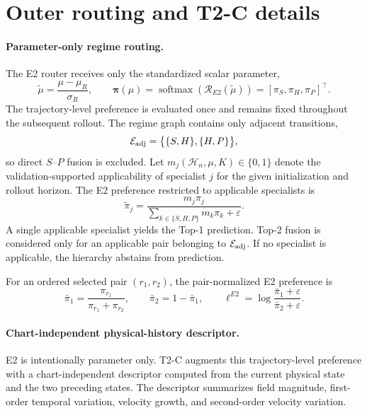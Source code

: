 \section{Outer routing and T2-C details}
\label{app:routing}

\paragraph{Parameter-only regime routing.}
The E2 router receives only the standardized scalar parameter,
\begin{equation}
  \widetilde\mu
  =
  \frac{\mu-\mu_R}{\sigma_R},
  \qquad
  \bm\pi(\mu)
  =
  \operatorname{softmax}
  \left(
    \mathcal R_{E2}(\widetilde\mu)
  \right)
  =
  [\pi_S,\pi_H,\pi_P]^\top .
  \label{eq:app_e2_parameter_only}
\end{equation}
The trajectory-level preference is evaluated once and remains fixed
throughout the subsequent rollout. The regime graph contains only adjacent transitions,
\begin{equation}
  \mathcal E_{\rm adj}
  =
  \bigl\{
    \{S,H\},
    \{H,P\}
  \bigr\},
  \label{eq:app_adjacency}
\end{equation}
so direct $S$--$P$ fusion is excluded.
Let
$m_j(\mathcal H_n,\mu,K)\in\{0,1\}$
denote the validation-supported applicability of specialist $j$ for the
given initialization and rollout horizon.
The E2 preference restricted to applicable specialists is
\begin{equation}
  \widetilde\pi_j
  =
  \frac{
    m_j\pi_j
  }{
    \sum_{k\in\{S,H,P\}}m_k\pi_k+\varepsilon
  }.
  \label{eq:app_masked_e2}
\end{equation}
A single applicable specialist yields the Top-1 prediction.
Top-2 fusion is considered only for an applicable pair belonging to
$\mathcal E_{\rm adj}$.
If no specialist is applicable, the hierarchy abstains from prediction.

For an ordered selected pair $(r_1,r_2)$, the pair-normalized E2
preference is
\begin{equation}
  \bar\pi_1
  =
  \frac{\pi_{r_1}}
       {\pi_{r_1}+\pi_{r_2}},
  \qquad
  \bar\pi_2
  =
  1-\bar\pi_1,
  \qquad
  \ell^{E2}
  =
  \log
  \frac{\bar\pi_1+\varepsilon}
       {\bar\pi_2+\varepsilon}.
  \label{eq:app_pair_logit}
\end{equation}


\paragraph{Chart-independent physical-history descriptor.}
E2 is intentionally parameter only.
T2-C augments this trajectory-level preference with a chart-independent
descriptor computed from the current physical state and the two preceding
states.
The descriptor summarizes field magnitude, first-order temporal variation,
velocity growth, and second-order velocity variation.

